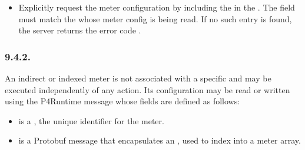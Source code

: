 \documentclass[11pt]{article}
\begin{document}
{\begin{itemize}
\item{}
Explicitly request the meter configuration by including the 
in the . The  field must match the
 whose meter config is being read. If no such entry is found, the
server returns the error code .%
\end{itemize}%

\subsubsection{9.4.2.\hspace*{0.5em}}\label{sec-meterentry}%

\noindent{}An indirect or indexed meter is not associated with a specific  and
may be executed independently of any action. Its configuration may be read or
written using the P4Runtime  message whose fields are defined as
follows:%

\begin{itemize}%

\item{}
 is a , the unique identifier for the meter.%

\item{}
 is a Protobuf message that encapsulates an , used to index into
a meter array.%


\end{itemize}}
\end{document}
